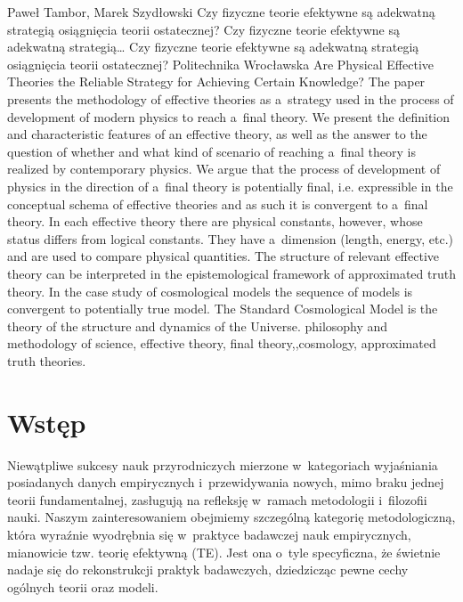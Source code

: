 \begin{artplenv}{Paweł Tambor, Marek Szydłowski}
	{Czy fizyczne teorie efektywne są adekwatną strategią osiągnięcia teorii ostatecznej?}
	{Czy fizyczne teorie efektywne są adekwatną strategią\ldots}
	{Czy fizyczne teorie efektywne są adekwatną strategią osiągnięcia teorii ostatecznej?}
	{Politechnika Wrocławska}
	{Are Physical Effective Theories the Reliable Strategy for Achieving Certain Knowledge?}
	{The paper presents the methodology of effective theories as a~strategy used in the process of development of modern physics to reach a~final theory. We present the definition and characteristic features of an effective theory, as well as the answer to the question of whether and what kind of scenario of reaching a~final theory is realized by contemporary physics. We argue that the process of development of physics in the direction of a~final theory is potentially final, i.e. expressible in the conceptual schema of effective theories and as such it is convergent to a~final theory. In each effective theory there are physical constants, however, whose status differs from logical constants. They have a~dimension (length, energy, etc.) and are used to compare physical quantities. The structure of relevant effective theory can be interpreted in the epistemological framework of approximated truth theory. In the case study of cosmological models the sequence of models is convergent to potentially true model. The Standard Cosmological Model is the theory of the structure and dynamics of the Universe.}
	{philosophy and methodology of science, effective theory, final theory,,cosmology, approximated truth theories.}


\section{Wstęp}
Niewątpliwe sukcesy nauk przyrodniczych mierzone w~kategoriach wyjaśniania posiadanych danych empirycznych i~przewidywania nowych, mimo braku jednej teorii fundamentalnej, zasługują na refleksję w~ramach metodologii i~filozofii nauki. Naszym zainteresowaniem obejmiemy szczególną kategorię metodologiczną, która wyraźnie wyodrębnia się w~praktyce badawczej nauk empirycznych, mianowicie tzw. teorię efektywną (TE). Jest ona o~tyle specyficzna, że świetnie nadaje się do rekonstrukcji praktyk badawczych, dziedzicząc pewne cechy ogólnych teorii oraz modeli.


\end{artplenv}
